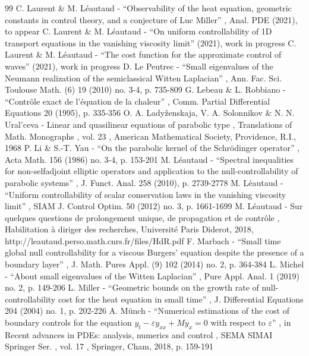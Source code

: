 \documentclass[11pt]{article}
\numberwithin{equation}{section}
\theoremstyle{definition}
\begin{document}
\begin{thebibliography}{99}
 C. Laurent \& M. Léautaud - “Observability of the heat equation, geometric constants in control theory, and a conjecture of Luc Miller” , Anal. PDE (2021), to appear
 C. Laurent \& M. Léautaud - “On uniform controllability of 1D transport equations in the vanishing viscosity limit” (2021), work in progress
 C. Laurent \& M. Léautaud - “The cost function for the approximate control of waves” (2021), work in progress
 D. Le Peutrec - “Small eigenvalues of the Neumann realization of the semiclassical Witten Laplacian” , Ann. Fac. Sci. Toulouse Math. (6) 19 (2010) no. 3-4, p. 735-809
 G. Lebeau \& L. Robbiano - “Contrôle exact de l’équation de la chaleur” , Comm. Partial Differential Equations 20 (1995), p. 335-356
 O. A. Ladyženskaja, V. A. Solonnikov \& N. N. Ural’ceva - Linear and quasilinear equations of parabolic type , Translations of Math. Monographs , vol. 23 , American Mathematical Society, Providence, R.I., 1968
 P. Li \& S.-T. Yau - “On the parabolic kernel of the Schrödinger operator” , Acta Math. 156 (1986) no. 3-4, p. 153-201
 M. Léautaud - “Spectral inequalities for non-selfadjoint elliptic operators and application to the null-controllability of parabolic systems” , J. Funct. Anal. 258 (2010), p. 2739-2778
 M. Léautaud - “Uniform controllability of scalar conservation laws in the vanishing viscosity limit” , SIAM J. Control Optim. 50 (2012) no. 3, p. 1661-1699
 M. Léautaud - Sur quelques questions de prolongement unique, de propagation et de contrôle , Habilitation à diriger des recherches, Université Paris Diderot, 2018, http://leautaud.perso.math.cnrs.fr/files/HdR.pdf
 F. Marbach - “Small time global null controllability for a viscous Burgers’ equation despite the presence of a boundary layer” , J. Math. Pures Appl. (9) 102 (2014) no. 2, p. 364-384
 L. Michel - “About small eigenvalues of the Witten Laplacian” , Pure Appl. Anal. 1 (2019) no. 2, p. 149-206
 L. Miller - “Geometric bounds on the growth rate of null-controllability cost for the heat equation in small time” , J. Differential Equations 204 (2004) no. 1, p. 202-226
 A. Münch - “Numerical estimations of the cost of boundary controls for the equation $y_t-\varepsilon y_{xx}+My_x=0$ with respect to $\varepsilon $” , in Recent advances in PDEs: analysis, numerics and control , SEMA SIMAI Springer Ser. , vol. 17 , Springer, Cham, 2018, p. 159-191

\end{thebibliography}
\end{document}
